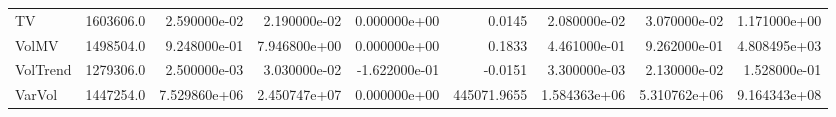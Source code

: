 \begin{tabular}{lrrrrrrrr}
TV         &  1603606.0 &  2.590000e-02 &  2.190000e-02 &  0.000000e+00 &       0.0145 &  2.080000e-02 &  3.070000e-02 &  1.171000e+00 \\
VolMV      &  1498504.0 &  9.248000e-01 &  7.946800e+00 &  0.000000e+00 &       0.1833 &  4.461000e-01 &  9.262000e-01 &  4.808495e+03 \\
VolTrend   &  1279306.0 &  2.500000e-03 &  3.030000e-02 & -1.622000e-01 &      -0.0151 &  3.300000e-03 &  2.130000e-02 &  1.528000e-01 \\
VarVol     &  1447254.0 &  7.529860e+06 &  2.450747e+07 &  0.000000e+00 &  445071.9655 &  1.584363e+06 &  5.310762e+06 &  9.164343e+08 \\
\bottomrule
\end{tabular}
